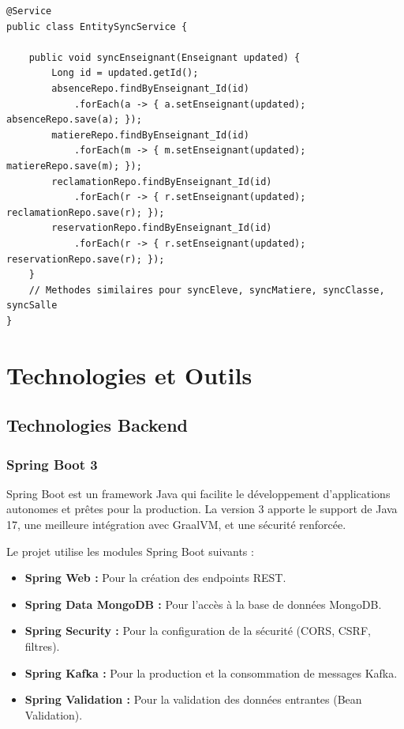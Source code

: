 \documentclass[12pt,a4paper,twoside]{report}
\begin{document}
\begin{lstlisting}[style=javaStyle, caption=Service de synchronisation des entités (EntitySyncService)]
@Service
public class EntitySyncService {
    
    public void syncEnseignant(Enseignant updated) {
        Long id = updated.getId();
        absenceRepo.findByEnseignant_Id(id)
            .forEach(a -> { a.setEnseignant(updated); absenceRepo.save(a); });
        matiereRepo.findByEnseignant_Id(id)
            .forEach(m -> { m.setEnseignant(updated); matiereRepo.save(m); });
        reclamationRepo.findByEnseignant_Id(id)
            .forEach(r -> { r.setEnseignant(updated); reclamationRepo.save(r); });
        reservationRepo.findByEnseignant_Id(id)
            .forEach(r -> { r.setEnseignant(updated); reservationRepo.save(r); });
    }
    // Methodes similaires pour syncEleve, syncMatiere, syncClasse, syncSalle
}
\end{lstlisting}

\chapter{Technologies et Outils}

\section{Technologies Backend}

\subsection{Spring Boot 3}
Spring Boot est un framework Java qui facilite le développement d'applications autonomes et prêtes pour la production. La version 3 apporte le support de Java 17, une meilleure intégration avec GraalVM, et une sécurité renforcée.

Le projet utilise les modules Spring Boot suivants :
\begin{itemize}[leftmargin=*]
  \item \textbf{Spring Web :} Pour la création des endpoints REST.
  \item \textbf{Spring Data MongoDB :} Pour l'accès à la base de données MongoDB.
  \item \textbf{Spring Security :} Pour la configuration de la sécurité (CORS, CSRF, filtres).
  \item \textbf{Spring Kafka :} Pour la production et la consommation de messages Kafka.
  \item \textbf{Spring Validation :} Pour la validation des données entrantes (Bean Validation).
\end{itemize}
\end{document}
